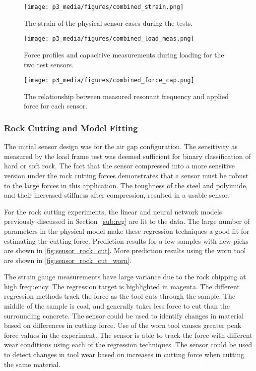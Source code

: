 \begin{figure}[]
\centering
\texttt{[image: p3\_media/figures/combined\_strain.png]}
\caption{The strain of the physical sensor cases during the tests. 
}
\label{fig:sensor_load_frame_strain}
\end{figure}

\begin{figure}[]
\centering
\texttt{[image: p3\_media/figures/combined\_load\_meas.png]}
\caption{Force profiles and capacitive measurements during loading for the two test sensors. 
}
\label{fig:sensor_load_frame}
\end{figure}

\begin{figure}[]
\centering
\texttt{[image: p3\_media/figures/combined\_force\_cap.png]}
\caption{The relationship between measured resonant frequency and applied force for each sensor.
}
\label{fig:sensor_load_frame_sensitivity}
\end{figure}


\subsubsection{Rock Cutting and Model Fitting}

The initial sensor design was for the air gap configuration. The sensitivity as measured by the 
load frame test was deemed sufficient for binary classification of hard or soft rock.
The fact that the sensor compressed into a more sensitive version under the rock cutting forces
demonstrates that a sensor must be robust to the large forces in this application.
The toughness of the steel and polyimide, and their increased stiffness after compression,
resulted in a usable sensor.

For the rock cutting experiments, the linear and neural network models 
 previously discussed in Section~\ref{sub:reg} are fit to the data.
The large number of parameters in the physical model make these regression
techniques a good fit for estimating the cutting force.
Prediction results for a few samples with new picks are shown in \ref{fig:sensor_rock_cut}.
More prediction results using the worn tool are shown in \ref{fig:sensor_rock_cut_worn}.

The strain gauge measurements have large variance due to the rock chipping at high frequency.
The regression target is highlighted in magenta. The different regression methods track the force
as the tool cuts through the sample. The middle of the sample is coal, and generally takes less force
to cut than the surrounding concrete.
The sensor could be used to identify changes in material based on differences in cutting force.
Use of the worn tool causes greater peak force values in the experiment.
The sensor is able to track the force with different wear conditions
using each of the regression techniques.
The sensor could be used to detect changes in tool wear based on increases in cutting force
when cutting the same material.

